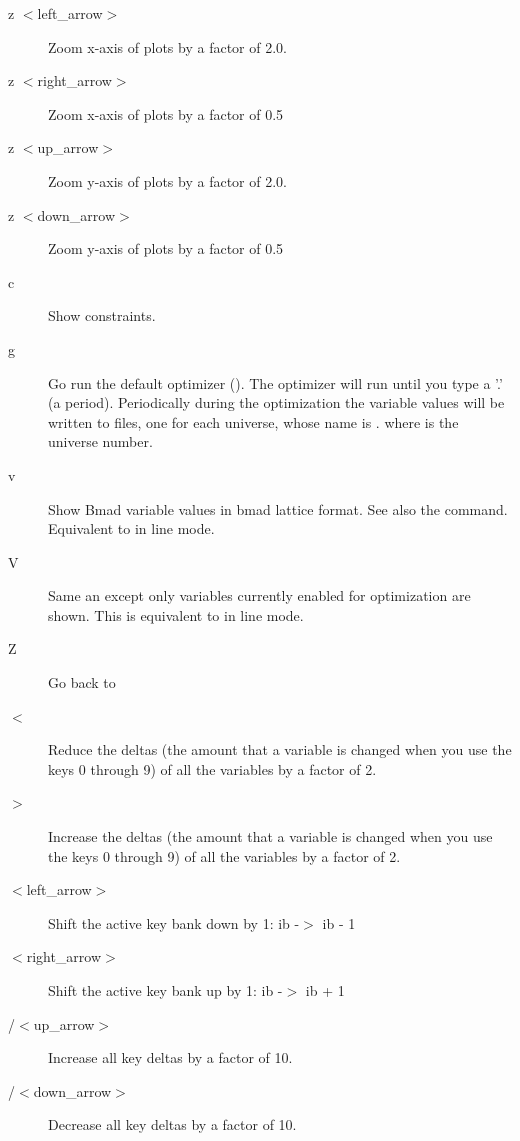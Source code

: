 {\begin{description}
\item[z $<$left\_arrow$>$]
Zoom x-axis of plots by a factor of 2.0.

\item[z $<$right\_arrow$>$]
Zoom x-axis of plots by a factor of 0.5

\item[z $<$up\_arrow$>$]
Zoom y-axis of plots by a factor of 2.0.

\item[z $<$down\_arrow$>$]
Zoom y-axis of plots by a factor of 0.5

\item[c]  
Show constraints.

\item[g]
Go run the default optimizer (). The optimizer will run until you type a '.' (a
period).  Periodically during the optimization the variable values will be written to files, one for
each universe, whose name is . where \vn{\#} is the universe number.

\item[v]
Show Bmad variable values in bmad lattice format. See also the  command. Equivalent to
 in line mode.

\item[V] 
Same an  except only variables currently enabled for optimization are shown.
This is equivalent to  in line mode.

\item[Z] 
Go back to 

\item[$<$]
Reduce the deltas (the amount that a variable is changed when you use
the keys 0 through 9) of all the variables by a factor of 2.

\item[$>$]
Increase the deltas (the amount that a variable is changed when you
use the keys 0 through 9) of all the variables by a factor of 2.

\item[$<$left\_arrow$>$]
Shift the active key bank down by 1: ib -$>$ ib - 1

\item[$<$right\_arrow$>$]
Shift the active key bank up by 1: ib -$>$ ib + 1

\item[/$<$up\_arrow$>$]
Increase all key deltas by a factor of 10.

\item[/$<$down\_arrow$>$]
Decrease all key deltas by a factor of 10.


\end{description}}

